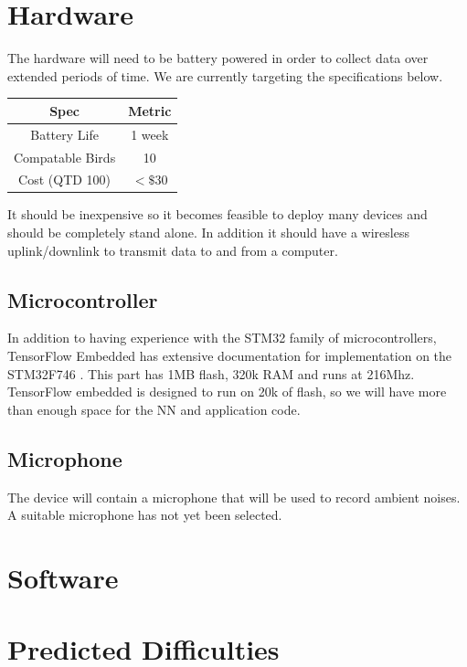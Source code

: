 \documentclass[12pt,journal,compsoc]{IEEEtran}
\begin{document}
\section{Hardware}
The hardware will need to be battery powered in order to collect data over extended periods of time. We are currently targeting the specifications below.

\begin{center}
\begin{tabular}{ c | c }
Spec             & Metric\\ 
\hline 
Battery Life     & 1 week\\
Compatable Birds & 10    \\
Cost (QTD 100)   & $<\$30$  \\
\end{tabular}
\end{center}

It should be inexpensive so it becomes feasible to deploy many devices and should be completely stand alone. In addition it should have a wiresless uplink/downlink to transmit data to and from a computer.

\subsection{Microcontroller}
In addition to having experience with the STM32 family of microcontrollers, TensorFlow Embedded \cite{TF} has extensive documentation for implementation on the STM32F746 \cite{STM}. This part has 1MB flash, 320k RAM and runs at 216Mhz. TensorFlow embedded is designed to run on 20k of flash, so we will have more than enough space for the NN and application code.

\subsection{Microphone}
The device will contain a microphone that will be used to record ambient noises. A suitable microphone has not yet been selected.

\section{Software}

\section{Predicted Difficulties}
\end{document}
